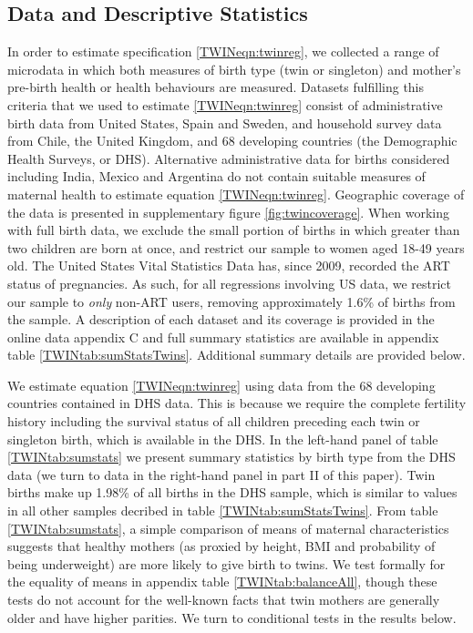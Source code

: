 \documentclass[subeqn]{article}
\begin{document}
\begin{spacing}{1.4}
\section{Data and Descriptive Statistics}              \label{TWINscn:data}
In order to estimate specification \ref{TWINeqn:twinreg}, we collected a range
of microdata in which both measures of birth type (twin or singleton) and
mother's pre-birth health or health behaviours are measured.  Datasets
fulfilling this criteria that we used to estimate \ref{TWINeqn:twinreg} consist
of administrative birth data from United States, Spain and Sweden, and household
survey data from Chile, the United Kingdom, and 68 developing countries (the
Demographic Health Surveys, or DHS).  Alternative administrative data for
births considered including India, Mexico and Argentina do not contain suitable
measures of maternal health to estimate equation \ref{TWINeqn:twinreg}.
Geographic coverage of the data is presented in supplementary figure
\ref{fig:twincoverage}. When
working with full birth data, we exclude the small portion of births in which
greater than two children are born at once, and restrict our sample to women
aged 18-49 years old. The United States Vital Statistics Data has, since 2009,
recorded the ART status of pregnancies.  As such, for all regressions
involving US data, we restrict our sample to \emph{only} non-ART users, removing
approximately 1.6\% of births from the sample.  A description of each dataset
and its coverage is provided in the online data appendix C and full summary
statistics are available in appendix table \ref{TWINtab:sumStatsTwins}.
Additional summary details are provided below.

We estimate equation \ref{TWINeqn:twinreg} using data from the 68 developing
countries contained in DHS data.  This is because we require the complete
fertility history including the survival status of all children preceding each
twin or singleton birth, which is available in the DHS.  In the left-hand panel
of table \ref{TWINtab:sumstats} we present summary statistics by birth type
from the DHS data (we turn to data in the right-hand panel in part II of this
paper). Twin births make up 1.98\% of all births
in the DHS sample, which is similar to values in all other samples decribed in
table \ref{TWINtab:sumStatsTwins}. From table \ref{TWINtab:sumstats}, a
simple comparison of means of maternal characteristics suggests that healthy
mothers (as proxied by height, BMI and probability of being underweight) are
more likely to give birth to twins. We test formally for
the equality of means in appendix table \ref{TWINtab:balanceAll}, though these
tests do not account for the well-known facts that twin mothers are generally
older and have higher parities.  We turn to conditional tests in the results
below.


\end{spacing}
\end{document}
